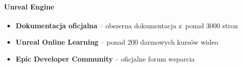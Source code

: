 \paragraph{Unreal Engine}
\begin{itemize}
    \item \textbf{Dokumentacja oficjalna} -- obszerna dokumentacja z~ponad 3000 stron~\cite{unreal_lumen}
    \item \textbf{Unreal Online Learning} -- ponad 200 darmowych kursów wideo~\cite{christopoulou2017overview}
    \item \textbf{Epic Developer Community} -- oficjalne forum wsparcia~\cite{barczak2019comparative}
\end{itemize}
